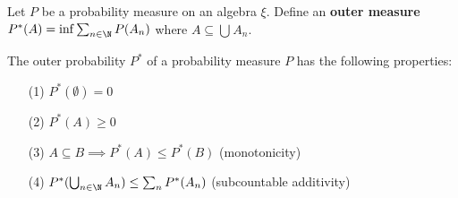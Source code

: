 \begin{definition}
   Let \( P  \) be a probability measure on an algebra \( \xi \). Define an \textbf{outer measure} \( P^{*}(A) = \inf \sum_{ n \in \N }^{  } P({A}_{n}) \) where \( A \subseteq  \bigcup_{  }^{  }  {A}_{n} \). 
\end{definition}

\begin{prop}
    The outer probability \( P^{*} \) of a probability measure \( P  \) has the following properties:
    \begin{enumerate}
        \item[(1)] \( P^{*}(\emptyset) = 0   \)
        \item[(2)] \( P^{*}(A) \geq 0  \)
        \item[(3)] \( A \subseteq B \implies P^{*}(A) \leq P^{*}(B) \) (monotonicity)
        \item[(4)] \( P^{*}(\bigcup_{ n \in \N }^{  }  {A}_{n}) \leq \sum_{ n  }^{  } P^{*}({A}_{n}) \) (subcountable additivity)
    \end{enumerate}
\end{prop}

